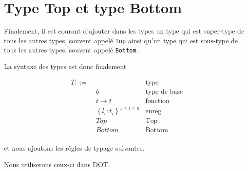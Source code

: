 \section{Type Top et type Bottom}

Finalement, il
est courant d'ajouter dans les types un type qui est super-type de tous les
autres types, souvent appelé \verb|Top| ainsi qu'un type qui est sous-type de
tous les autres types, souvent appelé \verb|Bottom|.

La syntaxe des types est donc finalement

\begin{align*}
  T ::= & \, & \text{type} \\
        & \; b & \text{type de base} \\
        & \; t \rightarrow t & \text{fonction} \\
        & \; \left\{ l_{i} : t_{i} \right\}^{1 \leq i \leq n} & \text{enreg} \\
        & \; Top & \text{Top} \\
        & \; Bottom & \text{Bottom} \\
\end{align*}

et nous ajoutons les règles de typage suivantes.


Nous utiliserons ceux-ci dans DOT.